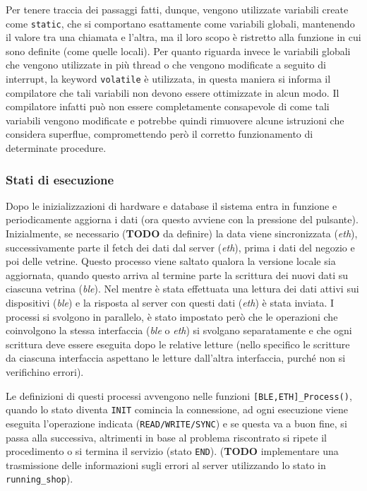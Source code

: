 Per tenere traccia dei passaggi fatti, dunque, vengono utilizzate variabili create come \texttt{static}, che si comportano esattamente come variabili globali, mantenendo il valore tra una chiamata e l'altra, ma il loro scopo \`e ristretto alla funzione in cui sono definite (come quelle locali). Per quanto riguarda invece le variabili globali che vengono utilizzate in pi\`u thread o che vengono modificate a seguito di interrupt, la keyword \texttt{volatile} \`e utilizzata, in questa maniera si informa il compilatore che tali variabili non devono essere ottimizzate in alcun modo. Il compilatore infatti pu\`o non essere completamente consapevole di come tali variabili vengono modificate e potrebbe quindi rimuovere alcune istruzioni che considera superflue, compromettendo per\`o il corretto funzionamento di determinate procedure.

\subsubsection{Stati di esecuzione}


Dopo le inizializzazioni di hardware e database il sistema entra in funzione e periodicamente aggiorna i dati (ora questo avviene con la pressione del pulsante). Inizialmente, se necessario (\textbf{TODO} da definire) la data viene sincronizzata (\textit{eth}), successivamente parte il fetch dei dati dal server (\textit{eth}), prima i dati del negozio e poi delle vetrine. Questo processo viene saltato qualora la versione locale sia aggiornata, quando questo arriva al termine parte la scrittura dei nuovi dati su ciascuna vetrina (\textit{ble}). Nel mentre \`e stata effettuata una lettura dei dati attivi sui dispositivi (\textit{ble}) e la risposta al server con questi dati (\textit{eth}) \`e stata inviata. I processi si svolgono in parallelo, \`e stato impostato per\`o che le operazioni che coinvolgono la stessa interfaccia (\textit{ble} o \textit{eth}) si svolgano separatamente e che ogni scrittura deve essere eseguita dopo le relative letture (nello specifico le scritture da ciascuna interfaccia aspettano le letture dall'altra interfaccia, purch\'e non si verifichino errori).

Le definizioni di questi processi avvengono nelle funzioni \texttt{[BLE,ETH]\_Process()}, quando lo stato diventa \texttt{INIT} comincia la connessione, ad ogni esecuzione viene eseguita l'operazione indicata (\texttt{READ/WRITE/SYNC}) e se questa va a buon fine, si passa alla successiva, altrimenti in base al problema riscontrato si ripete il procedimento o si termina il servizio (stato \texttt{END}). (\textbf{TODO} implementare una trasmissione delle informazioni sugli errori al server utilizzando lo stato in \texttt{running\_shop}).

